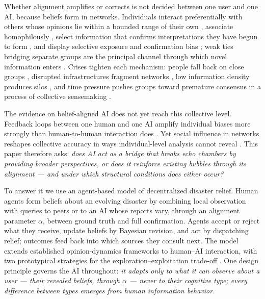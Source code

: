 \documentclass[pdflatex,sn-nature]{sn-jnl}
\begin{document}
Whether alignment amplifies or corrects is not decided between one user and one AI, because beliefs form in networks. Individuals interact preferentially with others whose opinions lie within a bounded range of their own \citep{hegselmann2002opinion}, associate homophilously \citep{mcpherson2001birds}, select information that confirms interpretations they have begun to form \citep{paulus2022influence}, and display selective exposure \citep{barbera2015tweeting} and confirmation bias \citep{paulus2024interplay}; weak ties bridging separate groups are the principal channel through which novel information enters \citep{granovetter1973strength}. Crises tighten each mechanism: people fall back on close groups \citep{comes2020coordination}, disrupted infrastructures fragment networks \citep{holguin2012unique}, low information density produces silos \citep{pan2012crisis}, and time pressure pushes groups toward premature consensus \citep{driskell1991group} in a process of collective sensemaking \citep{weick2005organizing}.

The evidence on belief-aligned AI does not yet reach this collective level. Feedback loops between one human and one AI amplify individual biases more strongly than human-to-human interaction does \citep{glickman2024human}. Yet social influence in networks reshapes collective accuracy in ways individual-level analysis cannot reveal \citep{lorenz2011social,becker2017network}. This paper therefore asks: \emph{does AI act as a bridge that breaks echo chambers by providing broader perspectives, or does it reinforce existing bubbles through its alignment --- and under which structural conditions does either occur?}

To answer it we use an agent-based model of decentralized disaster relief. Human agents form beliefs about an evolving disaster by combining local observation with queries to peers or to an AI whose reports vary, through an alignment parameter $\alpha$, between ground truth and full confirmation. Agents accept or reject what they receive, update beliefs by Bayesian revision, and act by dispatching relief; outcomes feed back into which sources they consult next. The model extends established opinion-dynamics frameworks \citep{deffuant2000mixing,hegselmann2002opinion} to human--AI interaction, with two prototypical strategies for the exploration--exploitation trade-off \citep{march1991exploration}. One design principle governs the AI throughout: \emph{it adapts only to what it can observe about a user --- their revealed beliefs, through $\alpha$ --- never to their cognitive type; every difference between types emerges from human information behavior.}
\end{document}
